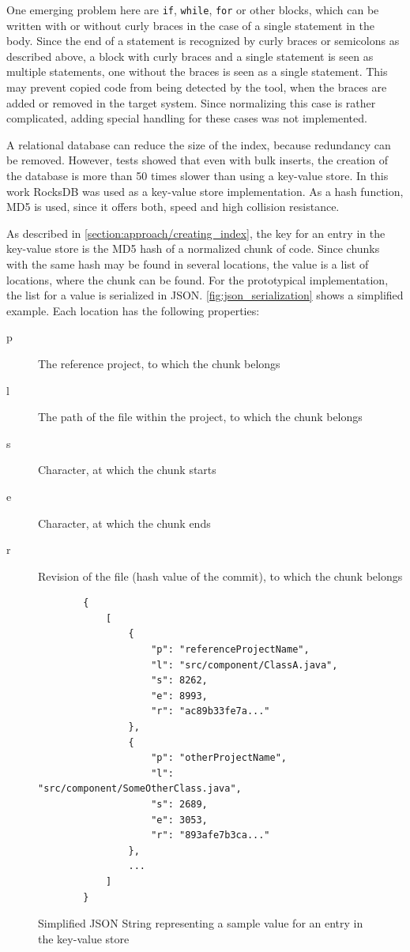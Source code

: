 One emerging problem here are \texttt{if}, \texttt{while}, \texttt{for} or other blocks, which can be written with or without curly braces in the case of a single statement in the body.
Since the end of a statement is recognized by curly braces or semicolons as described above, a block with curly braces and a single statement is seen as multiple statements, one without the braces is seen as a single statement.
This may prevent copied code from being detected by the tool, when the braces are added or removed in the target system.
Since normalizing this case is rather complicated, adding special handling for these cases was not implemented.

A relational database can reduce the size of the index, because redundancy can be removed.
However, tests showed that even with bulk inserts, the creation of the database is more than 50 times slower than using a key-value store.
In this work RocksDB was used as a key-value store implementation.
As a hash function, MD5 is used, since it offers both, speed and high collision resistance.

As described in \autoref{section:approach/creating_index}, the key for an entry in the key-value store is the MD5 hash of a normalized chunk of code.
Since chunks with the same hash may be found in several locations, the value is a list of locations, where the chunk can be found.
For the prototypical implementation, the list for a value is serialized in JSON.
\autoref{fig:json_serialization} shows a simplified example.
Each location has the following properties:
\begin{description}
	\item[p] The reference project, to which the chunk belongs
	\item[l] The path of the file within the project, to which the chunk belongs
	\item[s] Character, at which the chunk starts
	\item[e] Character, at which the chunk ends
	\item[r] Revision of the file (hash value of the commit), to which the chunk belongs
\end{description}

\begin{figure}[h]
	\centering
	\begin{lstlisting}
		{
			[
				{
					"p": "referenceProjectName",
					"l": "src/component/ClassA.java",
					"s": 8262,
					"e": 8993,
					"r": "ac89b33fe7a..."
				},
				{
					"p": "otherProjectName",
					"l": "src/component/SomeOtherClass.java",
					"s": 2689,
					"e": 3053,
					"r": "893afe7b3ca..."
				},
				...
			]
		}
	\end{lstlisting}
	\caption{Simplified JSON String representing a sample value for an entry in the key-value store}\label{fig:json_serialization}
\end{figure}

